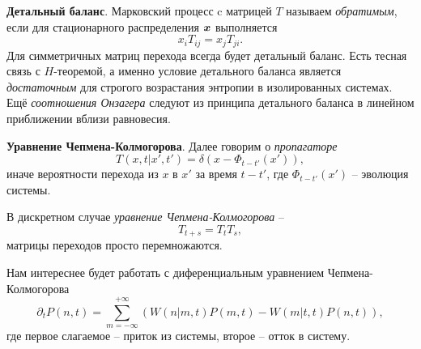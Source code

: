 \textbf{Детальный баланс}. Марковский процесс c матрицей $T$ называем \textit{обратимым}, если для стационарного распределения $\boldsymbol{x}$ выполняется
\begin{equation*}
	x_i T_{ij} = x_j T_{ji}.
\end{equation*}
Для симметричных матриц перехода всегда будет детальный баланс. Есть тесная связь с $H$-теоремой, а именно условие детального баланса является \textit{достаточным} для строгого возрастания энтропии в изолированных системах. Ещё \textit{соотношения Онзагера} следуют из принципа детального баланса в линейном приближении вблизи равновесия. 

\textbf{Уравнение Чепмена-Колмогорова}. Далее говорим о \textit{пропагаторе}
\begin{equation*}
	T(x, t| x', t') = \delta(x - \Phi_{t-t'}(x')),
\end{equation*}
иначе вероятности перехода из $x$ в $x'$ за время $t-t'$, где $\Phi_{t-t'}(x')$ -- эволюция системы. 

В дискретном случае \textit{уравнение Чепмена-Колмогорова} --
\begin{equation*}
	T_{t+s} = T_t T_s,
\end{equation*}
матрицы переходов просто перемножаются. 


Нам интереснее будет работать с диференциальным уравнением Чепмена-Колмогорова
\begin{equation}
	\partial_t P(n, t) = \sum_{m=-\infty}^{+\infty} \left(
		W(n|m, t) P(m,t) - W(m|t,t) P(n, t)
	\right),
\end{equation}
где первое слагаемое -- приток из системы, второе -- отток в систему.